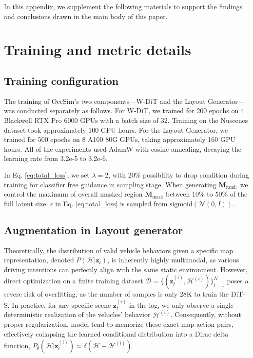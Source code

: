 In this appendix, we supplement the following materials to support the findings and conclusions drawn in the main body of this paper.

\startcontents[appendices]


\clearpage


\section{Training and metric details}
\label{sec:training_and_metrics_details}

\subsection{Training configuration}

The training of OccSim's two components—W-DiT and the Layout Generator—was conducted separately as follows. For W-DiT, we trained for 200 epochs on 4 Blackwell RTX Pro 6000 GPUs with a batch size of 32. Training on the Nuscenes dataset took approximately 100 GPU hours. For the Layout Generator, we trained for 500 epochs on 8 A100 80G GPUs, taking approximately 160 GPU hours. All of the experiments used AdamW with cosine annealing, decaying the learning rate from 3.2e-5 to 3.2e-6. 

In Eq. \ref{eq:total_loss}, we set $\lambda=2$, with 20\% possiblilty to drop condition during training for classifier free guidance \cite{ho2022classifier} in sampling stage. When generating $\mathbf{M}_{\text{rand}}$, we control the maximum of overall masked region $\mathbf{M}_{\text{mask}}$ between 10\% to 50\% of the full latent size. $\epsilon$ in Eq. \ref{eq:total_loss} is sampled from $\text{sigmoid}(\mathcal{N}(0, I))$. 


\subsection{Augmentation in Layout generator}
\label{sec:appendix_augmentations}


Theoretically, the distribution of valid vehicle behaviors given a specific map representation, denoted $P(\mathcal{H} | \mathbf{z}_{t})$, is inherently highly multimodal, as various driving intentions can perfectly align with the same static environment. However, direct optimization on a finite training dataset $\mathcal{D} = \{(\mathbf{z}_{t}^{(i)}, \mathcal{H}^{(i)})\}_{i=1}^{N}$ poses a severe risk of overfitting, as the number of samples is only 28K to train the DiT-S. In practice, for any specific scene $\mathbf{z}_{t}^{(i)}$ in the log, we only observe a single deterministic realization of the vehicles' behavior $\mathcal{H}^{(i)}$. Consequently, without proper regularization, model tend to memorize these exact map-action pairs, effectively collapsing the learned conditional distribution into a Dirac delta function, $P_{\theta}(\mathcal{H} | \mathbf{z}_{t}^{(i)}) \approx \delta(\mathcal{H} - \mathcal{H}^{(i)})$. 

